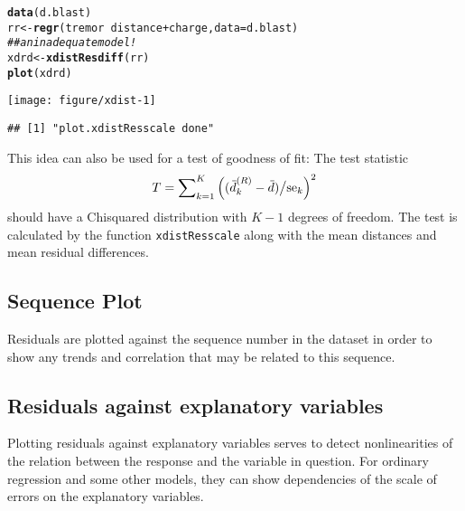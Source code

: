 \documentclass[11pt]{article}\usepackage[]{graphicx}\usepackage[]{color}
\makeatletter
\def\maxwidth{ %
  \ifdim\Gin@nat@width>\linewidth
    \linewidth
  \else
    \Gin@nat@width
  \fi
}
\newcommand{\hlcom}[1]{\textcolor[rgb]{0.678,0.584,0.686}{\textit{#1}}}%
\newcommand{\hlopt}[1]{\textcolor[rgb]{0,0,0}{#1}}%
\newcommand{\hlstd}[1]{\textcolor[rgb]{0.345,0.345,0.345}{#1}}%
\newcommand{\hlkwb}[1]{\textcolor[rgb]{0.69,0.353,0.396}{#1}}%
\newcommand{\hlkwc}[1]{\textcolor[rgb]{0.333,0.667,0.333}{#1}}%
\newcommand{\hlkwd}[1]{\textcolor[rgb]{0.737,0.353,0.396}{\textbf{#1}}}%
\newenvironment{kframe}{%
 \def\at@end@of@kframe{}%
 \ifinner\ifhmode%
  \def\at@end@of@kframe{\end{minipage}}%
  \begin{minipage}{\columnwidth}%
 \fi\fi%
 \def\FrameCommand##1{\hskip\@totalleftmargin \hskip-\fboxsep
 \colorbox{shadecolor}{##1}\hskip-\fboxsep
     \hskip-\linewidth \hskip-\@totalleftmargin \hskip\columnwidth}%
 \MakeFramed {\advance\hsize-\width
   \@totalleftmargin\z@ \linewidth\hsize
   \@setminipage}}%
 {\par\unskip\endMakeFramed%
 \at@end@of@kframe}
\newenvironment{knitrout}{}{} %
\makeatother
\begin{document}
\Bfig
\begin{knitrout}
\color{fgcolor}\begin{kframe}
\begin{alltt}
\hlkwd{data}\hlstd{(d.blast)}
\hlstd{rr} \hlkwb{<-} \hlkwd{regr}\hlstd{(tremor}\hlopt{~}\hlstd{distance}\hlopt{+}\hlstd{charge,} \hlkwc{data}\hlstd{=d.blast)}
\hlcom{## an inadequate model!}
\hlstd{xdrd} \hlkwb{<-} \hlkwd{xdistResdiff}\hlstd{(rr)}
\hlkwd{plot}\hlstd{(xdrd)}
\end{alltt}
\end{kframe}
\texttt{[image: figure/xdist-1]} 
\begin{kframe}\begin{verbatim}
## [1] "plot.xdistResscale done"
\end{verbatim}
\end{kframe}
\end{knitrout}

This idea can also be used for a test of goodness of fit: The test
statistic 
$$
  T = \sum\nolimits_{k=1}^K \left((\wb d\sups R_k-\wb d)\big/\mbox{se}_k\right)^2
$$
should have a Chisquared distribution with $K-1$ degrees of freedom.
The test is calculated by the function \texttt{xdistResscale} along with
the mean distances and mean residual differences.

\subsection{Sequence Plot}
Residuals are plotted against the sequence number in the dataset in order
to show any trends and correlation that may be related to this sequence.



\subsection{Residuals against explanatory variables}
Plotting residuals against explanatory variables serves to detect
nonlinearities of the relation between the response and the variable in
question. 
For ordinary regression and some other models, they can show dependencies
of the scale of errors on the explanatory variables.
\end{document}
